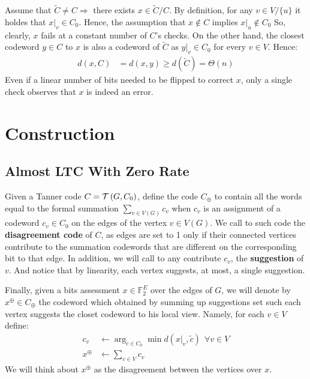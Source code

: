 \documentclass[manuscript,screen,review]{acmart}
\begin{document}
  Assume that $\tilde{C} \neq C \Rightarrow$ there exists $x\in \tilde{C} / C$. By definition, for any $v\in V / \{u\}$ it holdes that $x|_{v} \in C_{0}$. Hence, the assumption that $ x \notin C$  implies $x|_{u} \notin C_{0}$ So, clearly, $x$ fails at a constant number of $C$'s checks. On the other hand, the closest codeword $y \in C$ to $x$ is also a codeword of $\tilde{C}$ as $y|_{v} \in C_{0}$ for every $v\in V$.  Hence:
  \begin{equation*}
    \begin{split}
      d\left( x,C \right) &= d\left( x,y \right) \ge d\left( \tilde{C} \right) =\Theta\left( n \right)
    \end{split}
  \end{equation*}
  Even if a linear number of bits needed to be flipped to correct $x$, only a single check observes that $x$ is indeed an error.
  
  \section{Construction}
  \subsection{Almost LTC With Zero Rate}
  \begin{definition} Given a Tanner code $C = \mathcal{T}\left( G, C_0 \right)$, define the code $C_{\oplus}$ to contain all the words equal to the formal summation $ \sum_{v \in V\left( G \right)} {c_{v} }$ when $c_{v}$ is an assignment of a codeword $ c_{v} \in C_0 $  on the edges of the vertex $ v \in V\left( G \right)$.
  We call to such code the \textbf{disagreement code} of $C$, as edges are set to 1 only if their connected vertices contribute to the summation codewords that are different on the corresponding bit to that edge. In addition, we will call to any contribute $c_v$, the \textbf{suggestion} of $v$. And notice that by linearity, each vertex suggests, at most, a single suggestion.   

  Finally, given a bits assessment $x \in \mathbb{F}_{2}^{E}$ over the edges of $G$, we will denote by $x^{\oplus} \in C_{\oplus} $ the codeword which obtained by summing up suggestions set such each vertex suggests the closet codeword to his local view. Namely, for each $v \in V$ define:   
  \begin{equation*}
    \begin{split}
      c_{v} & \leftarrow \arg_{ \tilde{c} \in C_{0}} \min{ d( x|_{v} , \tilde{c} ) } \ \ \forall v\in V   \\
      x^{\oplus} & \leftarrow \sum_{v \in V}{c_{v}} 
    \end{split}
  \end{equation*}
  We will think about $x^{\oplus}$ as the disagreement between the vertices over $x$. 

\end{definition}
\end{document}
